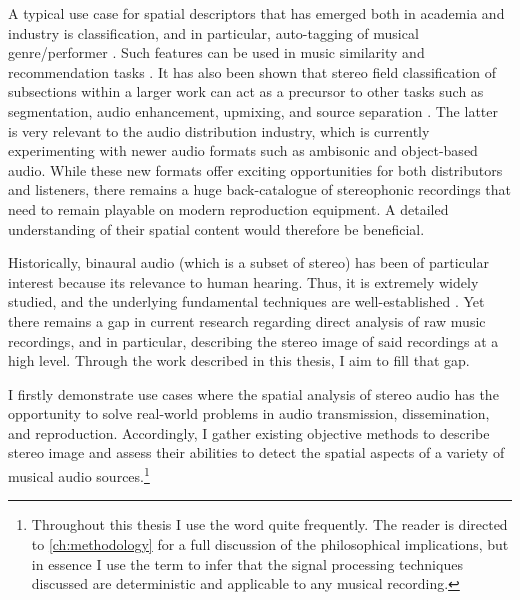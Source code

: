 A typical use case for spatial descriptors that has emerged both in academia and industry is classification, and in particular, auto-tagging of musical genre/performer \cite{tzanetakisStereoPanningInformation2010,ziemerGoniometersArePowerful2023}. Such features can be used in music similarity and recommendation tasks \cite{gomezMusicSimilaritySystems2008,ziemerNovelRecordingStudio2020}. It has also been shown that stereo field classification of subsections within a larger work can act as a precursor to other tasks such as segmentation, audio enhancement, upmixing, and source separation \cite{barryMusicStructureSegmentation2007,harmaStereoAudioClassification2011,harmaClassificationTimefrequencyRegions2011}. The latter is very relevant to the audio distribution industry, which is currently experimenting with newer audio formats such as ambisonic and object-based audio. While these new formats offer exciting opportunities for both distributors and listeners, there remains a huge back-catalogue of stereophonic recordings that need to remain playable on modern reproduction equipment. A detailed  understanding of their spatial content would therefore be beneficial.

Historically, binaural audio (which is a subset of stereo) has been of particular interest because its relevance to human hearing. Thus, it is extremely widely studied, and the underlying fundamental techniques are well-established \cite{blauertTechnologyBinauralListening2013}. Yet there remains a gap in current research regarding direct analysis of raw music recordings, and in particular, describing the stereo image of said recordings at a high level. Through the work described in this thesis, I aim to fill that gap. 

I firstly demonstrate use cases where the spatial analysis of stereo audio has the opportunity to solve real-world problems in audio transmission, dissemination, and reproduction. Accordingly, I gather existing objective methods to describe stereo image and assess their abilities to detect the spatial aspects of a variety of musical audio sources.\footnote{Throughout this thesis I use the word  quite frequently. The reader is directed to \cref{ch:methodology} for a full discussion of the philosophical implications, but in essence I use the term to infer that the signal processing techniques discussed are deterministic and applicable to any musical recording.} 